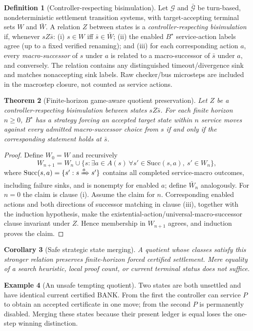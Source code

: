 \documentclass[11pt,letterpaper,oneside]{book}
\newtheorem{theorem}{Theorem}[chapter]
\newtheorem{corollary}[theorem]{Corollary}
\theoremstyle{definition}
\newtheorem{definition}[theorem]{Definition}
\newtheorem{example}[theorem]{Example}
\theoremstyle{remark}
\begin{document}
\begin{definition}[Controller-respecting bisimulation]
Let $\mathcal G$ and $\bar{\mathcal G}$ be turn-based, nondeterministic
settlement transition systems, with target-accepting terminal sets
$W$ and $\bar W$. A relation $Z$ between states is a
\emph{controller-respecting bisimulation} if, whenever $sZ\bar s$:
(i) $s\in W$ iff $\bar s\in\bar W$;
(ii) the enabled $B^\star$ service-action labels agree (up to a
fixed verified renaming); and (iii) for each corresponding action
$a$, every \emph{macro-successor} of $s$ under $a$ is related
to a macro-successor of $\bar s$ under $a$, and conversely.
The relation contains any distinguished timeout/divergence sink and
matches nonaccepting sink labels. Raw checker/bus microsteps are
included in the macrostep closure, not counted as service actions.
\end{definition}

\begin{theorem}[Finite-horizon game-aware quotient preservation]\label{thm:quotient}
Let $Z$ be a controller-respecting bisimulation between states
$sZ\bar s$. For each finite horizon $n\ge0$, $B^\star$ has a
strategy forcing an accepted target state within $n$ service moves
against every admitted macro-successor choice from $s$ if and only if the
corresponding statement holds at $\bar s$.
\end{theorem}
\begin{proof}
Define $W_0=W$ and recursively
\[
 W_{n+1}=W_n\cup\{s:\exists a\in A(s)\ \forall s'\in\mathrm{Succ}(s,a),
 \ s'\in W_n\},
\]
where $\mathrm{Succ}(s,a)=\{s' : s\xRightarrow{a}s'\}$
contains all completed service-macro outcomes, including failure sinks,
and is nonempty for enabled $a$; define $\bar W_n$ analogously.
For $n=0$ the claim is clause (i). Assume the claim for $n$.
Corresponding enabled actions and both directions of successor
matching in clause (iii), together with the induction hypothesis,
make the existential-action/universal-macro-successor clause invariant
under $Z$. Hence membership in $W_{n+1}$ agrees, and induction proves
the claim.\end{proof}
\begin{corollary}[Safe strategic state merging]
A quotient whose classes satisfy this stronger relation preserves
finite-horizon forced certified settlement. Mere equality of a
search heuristic, local proof count, or current terminal status does
not suffice.\end{corollary}

\begin{example}[An unsafe tempting quotient]
Two states are both unsettled and have identical current certified
BANK. From the first the controller can service $P$ to obtain an
accepted certificate in one move; from the second $P$ is permanently
disabled. Merging these states because their present ledger is equal
loses the one-step winning distinction.\end{example}
\end{document}
